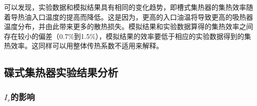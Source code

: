 可以发现，实验数据和模拟结果具有相同的变化趋势，即槽式集热器的集热效率随着导热油入口温度的提高而降低。这是因为，更高的入口油温将导致更高的吸热器温度分布，并由此带来更多的散热损失。模拟结果和实验数据算得的集热效率之间存在较小的偏差（0.7\%到1.5\%），模拟结果的效率要低于相应的实验数据得到的集热效率。这同样可以用整体传热系数不适用来解释。

\subsection{碟式集热器实验结果分析}
\subsubsection{$I_r$的影响}

